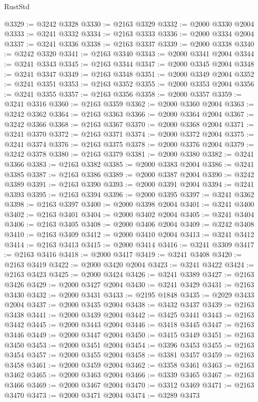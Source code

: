 \begin{lexlean}{RustStd}
\begin{coremodule}
{\begin{coremodule}
{{{{{{{{{{{{{{{{{{{{{{{{{{{{{{{@3329 := @3242 @3328
@3330 := @2163 @3329
@3332 := @2000 @3330 @2004
@3333 := @3241 @3332
@3334 := @2163 @3333
@3336 := @2000 @3334 @2004
@3337 := @3241 @3336
@3338 := @2163 @3337
@3339 := @2000 @3338
@3340 := @3242 @3320
@3341 := @2163 @3340
@3343 := @2000 @3341 @2004
@3344 := @3241 @3343
@3345 := @2163 @3344
@3347 := @2000 @3345 @2004
@3348 := @3241 @3347
@3349 := @2163 @3348
@3351 := @2000 @3349 @2004
@3352 := @3241 @3351
@3353 := @2163 @3352
@3355 := @2000 @3353 @2004
@3356 := @3241 @3355
@3357 := @2163 @3356
@3358 := @2000 @3357
@3359 := @3241 @3316
@3360 := @2163 @3359
@3362 := @2000 @3360 @2004
@3363 := @3242 @3362
@3364 := @2163 @3363
@3366 := @2000 @3364 @2004
@3367 := @3242 @3366
@3368 := @2163 @3367
@3370 := @2000 @3368 @2004
@3371 := @3241 @3370
@3372 := @2163 @3371
@3374 := @2000 @3372 @2004
@3375 := @3241 @3374
@3376 := @2163 @3375
@3378 := @2000 @3376 @2004
@3379 := @3242 @3378
@3380 := @2163 @3379
@3381 := @2000 @3380
@3382 := @3241 @3366
@3383 := @2163 @3382
@3385 := @2000 @3383 @2004
@3386 := @3241 @3385
@3387 := @2163 @3386
@3389 := @2000 @3387 @2004
@3390 := @3242 @3389
@3391 := @2163 @3390
@3393 := @2000 @3391 @2004
@3394 := @3241 @3393
@3395 := @2163 @3394
@3396 := @2000 @3395
@3397 := @3241 @3362
@3398 := @2163 @3397
@3400 := @2000 @3398 @2004
@3401 := @3241 @3400
@3402 := @2163 @3401
@3404 := @2000 @3402 @2004
@3405 := @3241 @3404
@3406 := @2163 @3405
@3408 := @2000 @3406 @2004
@3409 := @3242 @3408
@3410 := @2163 @3409
@3412 := @2000 @3410 @2004
@3413 := @3241 @3412
@3414 := @2163 @3413
@3415 := @2000 @3414
@3416 := @3241 @3309
@3417 := @2163 @3416
@3418 := @2000 @3417
@3419 := @3241 @3408
@3420 := @2163 @3419
@3422 := @2000 @3420 @2004
@3423 := @3241 @3422
@3424 := @2163 @3423
@3425 := @2000 @3424
@3426 := @3241 @3389
@3427 := @2163 @3426
@3429 := @2000 @3427 @2004
@3430 := @3241 @3429
@3431 := @2163 @3430
@3432 := @2000 @3431
@3433 := @2195 @1848
@3435 := @2029 @3433 @2004
@3437 := @2000 @3435 @2004
@3438 := @3432 @3437
@3439 := @2163 @3438
@3441 := @2000 @3439 @2004
@3442 := @3425 @3441
@3443 := @2163 @3442
@3445 := @2000 @3443 @2004
@3446 := @3418 @3445
@3447 := @2163 @3446
@3449 := @2000 @3447 @2004
@3450 := @3415 @3449
@3451 := @2163 @3450
@3453 := @2000 @3451 @2004
@3454 := @3396 @3453
@3455 := @2163 @3454
@3457 := @2000 @3455 @2004
@3458 := @3381 @3457
@3459 := @2163 @3458
@3461 := @2000 @3459 @2004
@3462 := @3358 @3461
@3463 := @2163 @3462
@3465 := @2000 @3463 @2004
@3466 := @3339 @3465
@3467 := @2163 @3466
@3469 := @2000 @3467 @2004
@3470 := @3312 @3469
@3471 := @2163 @3470
@3473 := @2000 @3471 @2004
@3474 := @3289 @3473
}}}}}}}}}}}}}}}}}}}}}}}}}}}}}}}
\end{coremodule}}
\end{coremodule}
\end{lexlean}
